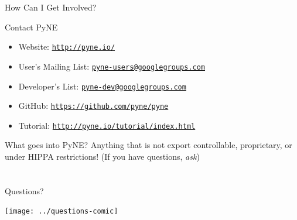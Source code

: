 \documentclass[xcolor=x11names,compress]{beamer}
\renewcommand{\(}{\begin{columns}}
\renewcommand{\)}{\end{columns}}
\newcommand{\<}[1]{\begin{column}{#1}}
\renewcommand{\>}{\end{column}}
\begin{document}
\begin{frame}{How Can I Get Involved?}

    \begin{block}{\alert{Contact PyNE}}
    \begin{itemize}
    \item Website: \href{http://pyne.io/}{\texttt{http://pyne.io/}}
    
    \item User's Mailing List: \href{pyne-users@googlegroups.com}
    {\texttt{pyne-users@googlegroups.com}}
    
    \item Developer's List: \href{pyne-dev@googlegroups.com}
    {\texttt{pyne-dev@googlegroups.com}}
    
    \item GitHub: \href{https://github.com/pyne/pyne}
    {\texttt{https://github.com/pyne/pyne}}
    
    \item Tutorial: \href{http://pyne.io/tutorial/index.html}
    {\texttt{http://pyne.io/tutorial/index.html}}

    \end{itemize}
    \end{block}
    
    \vspace*{2 em}
    \begin{block}{\alert{What goes into PyNE?}}
    Anything that is not export controllable, proprietary, 
    or under HIPPA restrictions!  (If you have questions, \emph{ask})
    \end{block}
  
\end{frame}


\section*{}
\begin{frame}[fragile]{Questions?}

    \begin{center}
    \texttt{[image: ../questions-comic]}  
    \end{center}
  
\end{frame}
\end{document}
